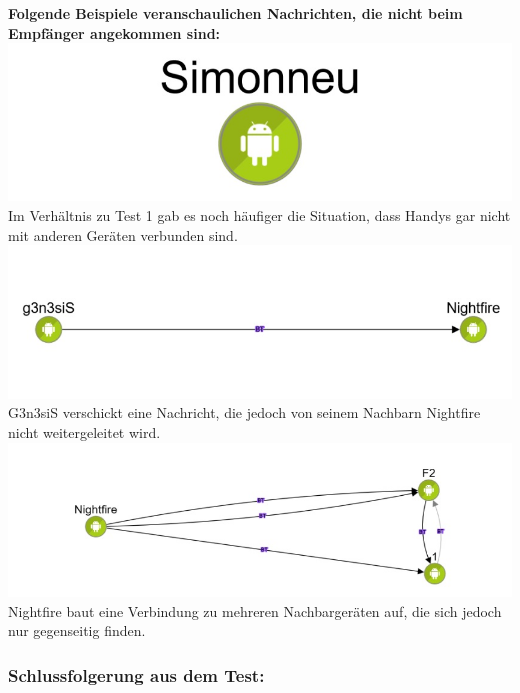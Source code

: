 \textbf{Folgende Beispiele veranschaulichen Nachrichten, die nicht beim
Empfänger angekommen sind:}\\
\includegraphics[width=1.0\textwidth]{belege/grosstests/Bilder/Grosstest2/Test2Misserfolg1.jpg}\\
Im Verhältnis zu Test 1 gab es noch häufiger die Situation, dass Handys
gar nicht mit anderen Geräten verbunden sind.\\
\includegraphics[width=1.0\textwidth]{belege/grosstests/Bilder/Grosstest2/Test2Misserfolg2.jpg}\\
G3n3siS verschickt eine Nachricht, die jedoch von seinem Nachbarn
Nightfire nicht weitergeleitet wird.\\
\includegraphics[width=1.0\textwidth]{belege/grosstests/Bilder/Grosstest2/Test2Misserfolg3.jpg}\\
Nightfire baut eine Verbindung zu mehreren Nachbargeräten auf, die sich
jedoch nur gegenseitig finden.\\

\subsubsection{Schlussfolgerung aus dem
Test:}\label{schlussfolgerung-aus-dem-test-3}\\

